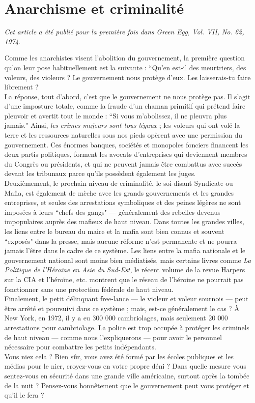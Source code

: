 \chapter{Anarchisme et criminalité}

\emph{Cet article a été publié pour la première fois dans Green Egg, Vol. VII, No. 62, 1974.\\}

Comme les anarchistes visent l'abolition du gouvernement, la première question qu'on leur pose habituellement est la suivante : ``Qu'en est-il des meurtriers, des voleurs, des violeurs ? Le gouvernement nous protège d'eux. Les laisserais-tu faire librement ?\\
La réponse, tout d'abord, c'est que le gouvernement ne nous protège pas. Il s'agit d'une imposture totale, comme la fraude d'un chaman primitif qui prétend faire pleuvoir et avertit tout le monde : ``Si vous m'abolissez, il ne pleuvra plus jamais." Ainsi, \emph{les crimes majeurs sont tous légaux} ; les voleurs qui ont volé la terre et les ressources naturelles sous nos pieds opèrent avec une permission du gouvernement. Ces énormes banques, sociétés et monopoles fonciers financent les deux partis politiques, forment les avocats d'entreprises qui deviennent membres du Congrès ou présidents, et qui ne peuvent jamais être combattus avec succès devant les tribunaux parce qu'ils possèdent également les juges.\\
Deuxièmement, le prochain niveau de criminalité, le soi-disant Syndicate ou Mafia, est également de mèche avec les grands gouvernements et les grandes entreprises, et seules des arrestations symboliques et des peines légères ne sont imposées à leurs ``chefs des gangs" --- généralement des rebelles devenus impopulaires auprès des mafieux de haut niveau. Dans toutes les grandes villes, les liens entre le bureau du maire et la mafia sont bien connus et souvent ``exposés" dans la presse, mais aucune réforme n'est permanente et ne pourra jamais l'être dans le cadre de ce système. Les liens entre la mafia nationale et le gouvernement national sont moins bien médiatisés, mais certains livres comme \emph{La Politique de l'Héroïne en Asie du Sud-Est}, le récent volume de la revue Harpers sur la CIA et l'héroïne, etc. montrent que le réseau de l'héroine ne pourrait pas fonctionner sans une protection fédérale de haut niveau.\\
Finalement, le petit délinquant free-lance --- le violeur et voleur sournois --- peut être arrêté et poursuivi dans ce système ; mais, est-ce généralement le cas ? À New York, en 1972, il y a eu 300 000 cambriolages, mais seulement 20 000 arrestations pour cambriolage. La police est trop occupée à protéger les criminels de haut niveau --- comme nous l'expliquerons --- pour avoir le personnel nécessaire pour combattre les petits indépendants.\\
Vous niez cela ? Bien sûr, vous avez été formé par les écoles publiques et les médias pour le nier, croyez-vous en votre propre déni ? Dans quelle mesure vous sentez-vous en sécurité dans une grande ville américaine, surtout après la tombée de la nuit ? Pensez-vous honnêtement que le gouvernement peut vous protéger et qu'il le fera ?

